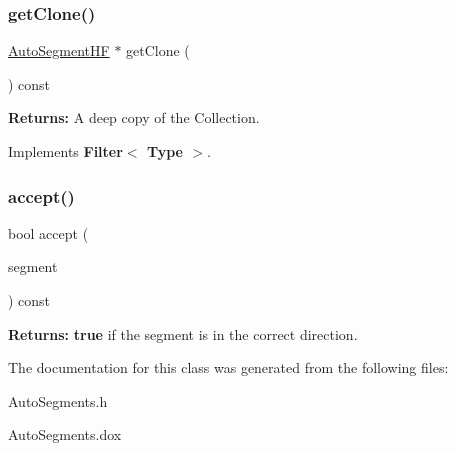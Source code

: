 \subsubsection{\texorpdfstring{get\+Clone()}{getClone()}}
{\footnotesize\ttfamily \hyperlink{namespaceKatabatic_a790418bb65a9a13859868df3e8f53598}{Auto\+Segment\+HF} $\ast$ get\+Clone (\begin{DoxyParamCaption}{ }\end{DoxyParamCaption}) const\hspace{0.3cm}{\ttfamily [virtual]}}

{\bfseries Returns\+:} A deep copy of the Collection. 

Implements \textbf{ Filter$<$ Type $>$}.

\mbox{\label{classKatabatic_1_1AutoSegments__InDirection_adfb5e1308226f0b97fb6825e3eab11a9}} 
\subsubsection{\texorpdfstring{accept()}{accept()}}
{\footnotesize\ttfamily bool accept (\begin{DoxyParamCaption}\item[{\hyperlink{classKatabatic_1_1AutoSegment}{Auto\+Segment} $\ast$}]{segment }\end{DoxyParamCaption}) const\hspace{0.3cm}{\ttfamily [virtual]}}

{\bfseries Returns\+:} {\bfseries true} if the {\ttfamily segment} is in the correct direction. 

The documentation for this class was generated from the following files\+:\begin{DoxyCompactItemize}
\item 
Auto\+Segments.\+h\item 
Auto\+Segments.\+dox\end{DoxyCompactItemize}
